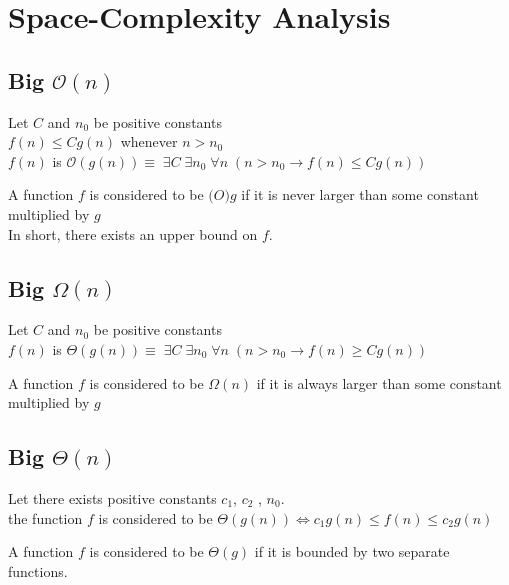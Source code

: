 \documentclass[a4paper]{article}
\newenvironment{definition}[1][Formal Definition]{\begin{trivlist}\item[\hskip \labelsep {\bfseries #1}]}{\end{trivlist}}
\newenvironment{indef}[1][Informal Definition]{\begin{trivlist}\item[\hskip \labelsep {\bfseries #1}]}{\end{trivlist}}
\begin{document}
\section{Space-Complexity Analysis}
\subsection{Big $\mathcal{O}(n)$} 
\begin{definition} Let $C$ and $n_0$ be positive constants  \\
$f(n) \leq Cg(n)$ whenever $n>n_0$\\
$f(n)$ is $ \mathcal{O}(g(n)) \equiv \; \exists C \; \exists n_0 \; \forall n \;(n > n_0 \rightarrow f(n) \leq Cg(n))$
\cite{Auckland}
\end{definition}
\begin{indef}
A function $f$ is considered to be $\mathcal(O){g}$ if it is never larger than some constant multiplied by $g$\\
In short, there exists an upper bound on $f$.
\end{indef}

\subsection{Big $\Omega(n)$}
\begin{definition}Let $C$ and $n_0$ be positive constants  \\
$f(n)$ is $ \Theta(g(n)) \equiv \; \exists C \; \exists n_0 \; \forall n \;(n > n_0 \rightarrow f(n) \geq Cg(n))$
\cite{Auckland}
\end{definition}
\begin{indef}
A function $f$ is considered to be $\Omega(n)$ if it is always larger than some constant multiplied by $g$	
\end{indef}

\subsection{Big $\Theta(n)$}
\begin{definition}
Let there exists positive constants $c_1$, $c_2$ , $n_0$.\\
the function $f$ is considered to be $\Theta(g(n)) \iff c_1g(n) \leq f(n) \leq c_2g(n)$
\cite{Auckland} 
\end{definition}
\begin{indef}
A function $f$ is considered to be $\Theta(g)$ if it is bounded by two separate functions.	
\end{indef}
\end{document}
